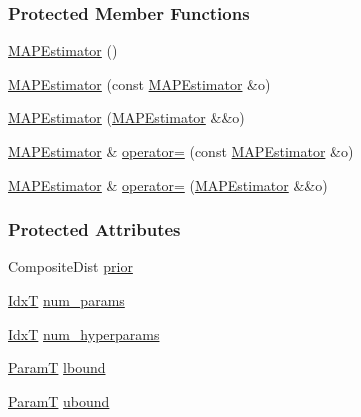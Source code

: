 \subsubsection*{Protected Member Functions}
\begin{DoxyCompactItemize}
\item 
\hyperlink{classmappel_1_1MAPEstimator_a4468358f63d220ac87002d2ce52d41e6}{M\+A\+P\+Estimator} ()
\item 
\hyperlink{classmappel_1_1MAPEstimator_a1e64713deec6f650cf7f747c04ee5dcb}{M\+A\+P\+Estimator} (const \hyperlink{classmappel_1_1MAPEstimator}{M\+A\+P\+Estimator} \&o)
\item 
\hyperlink{classmappel_1_1MAPEstimator_a616f193a61c399d1965b5a74ddccda10}{M\+A\+P\+Estimator} (\hyperlink{classmappel_1_1MAPEstimator}{M\+A\+P\+Estimator} \&\&o)
\item 
\hyperlink{classmappel_1_1MAPEstimator}{M\+A\+P\+Estimator} \& \hyperlink{classmappel_1_1MAPEstimator_ace0b9fc97cf5455fc48cb931feb4bbf7}{operator=} (const \hyperlink{classmappel_1_1MAPEstimator}{M\+A\+P\+Estimator} \&o)
\item 
\hyperlink{classmappel_1_1MAPEstimator}{M\+A\+P\+Estimator} \& \hyperlink{classmappel_1_1MAPEstimator_ab9a2e8643c12fc083b3c7b86c9e6621a}{operator=} (\hyperlink{classmappel_1_1MAPEstimator}{M\+A\+P\+Estimator} \&\&o)
\end{DoxyCompactItemize}
\subsubsection*{Protected Attributes}
\begin{DoxyCompactItemize}
\item 
Composite\+Dist \hyperlink{classmappel_1_1PointEmitterModel_a393839f8eb1dd3d61c9369377742ba0e}{prior}
\item 
\hyperlink{namespacemappel_ab17ec0f30b61ece292439d7ece81d3a8}{IdxT} \hyperlink{classmappel_1_1PointEmitterModel_a9af0484391bd6021ddc04ac666ab49ad}{num\+\_\+params}
\item 
\hyperlink{namespacemappel_ab17ec0f30b61ece292439d7ece81d3a8}{IdxT} \hyperlink{classmappel_1_1PointEmitterModel_ab2423214fdd81c8212118770b5b17b1f}{num\+\_\+hyperparams}
\item 
\hyperlink{classmappel_1_1PointEmitterModel_a665ec6aea3aac139bb69a23c06d4b9a1}{ParamT} \hyperlink{classmappel_1_1PointEmitterModel_a889bc82f74cfa654da121e5770296ab2}{lbound}
\item 
\hyperlink{classmappel_1_1PointEmitterModel_a665ec6aea3aac139bb69a23c06d4b9a1}{ParamT} \hyperlink{classmappel_1_1PointEmitterModel_a35b883e84b6a2e0093bdf482c623beef}{ubound}
\end{DoxyCompactItemize}



